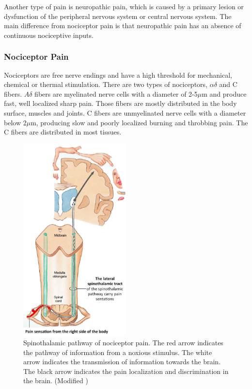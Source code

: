 Another type of pain is neuropathic pain, which is caused by a primary lesion or dysfunction of the peripheral nervous system or central nervous system. The main difference from nociceptor pain is that neuropathic pain has an absence of continuous nociceptive inputs. \cite{Kerstman2013}

\subsubsection{Nociceptor Pain}
Nociceptors are free nerve endings and have a high threshold for mechanical, chemical or thermal stimulation. There are two types of nociceptors, $\alpha\delta$ and C fibers. $A\delta$ fibers are myelinated nerve cells with a diameter of 2-5$\mu$m and produce fast, well localized sharp pain. Those fibers are mostly distributed in the body surface, muscles and joints. C fibers are unmyelinated nerve cells with a diameter below 2$\mu$m, producing slow and poorly localized burning and throbbing pain. The C fibers are distributed in most tissues. \cite{Steeds2013}
\vspace{1cm}

\begin{figure}[H]
	\includegraphics[width=0.5\textwidth]{figures/pathways.png} 
	\caption{Spinothalamic pathway of nociceptor pain. The red arrow indicates the pathway of information from a noxious stimulus. The white arrow indicates the transmission of information towards the brain. The black arrow indicates the pain localization and discrimination in the brain. (Modified \cite{Martini2012})}
	\label{fig:pathways}  
\end{figure} 


